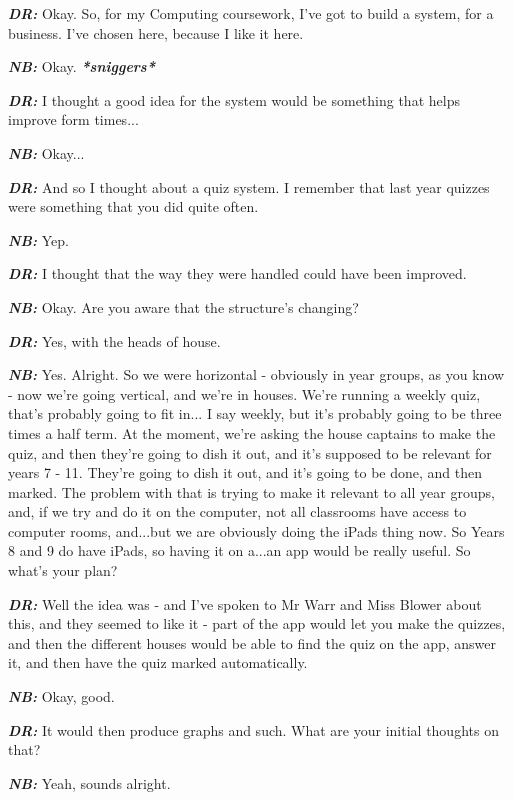 \textit{\textbf{DR:}} Okay. So, for my Computing coursework, I've got to build a system, for a business. I've chosen here, because I like it here.

\textit{\textbf{NB:}} Okay. \textit{\textbf{*sniggers*}}

\textit{\textbf{DR:}} I thought a good idea for the system would be something that helps improve form times...

\textit{\textbf{NB:}} Okay...

\textit{\textbf{DR:}} And so I thought about a quiz system. I remember that last year quizzes were something that you did quite often.

\textit{\textbf{NB:}} Yep.

\textit{\textbf{DR:}} I thought that the way they were handled could have been improved.

\textit{\textbf{NB:}} Okay. Are you aware that the structure's changing?

\textit{\textbf{DR:}} Yes, with the heads of house.

\textit{\textbf{NB:}} Yes. Alright. So we were horizontal - obviously in year groups, as you know - now we're going vertical, and we're in houses. We're running a weekly quiz, that's probably going to fit in... I say weekly, but it's probably going to be three times a half term. At the moment, we're asking the house captains to make the quiz, and then they're going to dish it out, and it's supposed to be relevant for years 7 - 11. They're going to dish it out, and it's going to be done, and then marked. The problem with that is trying to make it relevant to all year groups, and, if we try and do it on the computer, not all classrooms have access to computer rooms, and...but we are obviously doing the iPads thing now. So Years 8 and 9 do have iPads, so having it on a...an app would be really useful. So what's your plan?

\textit{\textbf{DR:}} Well the idea was - and I've spoken to Mr Warr and Miss Blower about this, and they seemed to like it - part of the app would let you make the quizzes, and then the different houses would be able to find the quiz on the app, answer it, and then have the quiz marked automatically.

\textit{\textbf{NB:}} Okay, good.

\textit{\textbf{DR:}} It would then produce graphs and such. What are your initial thoughts on that?

\textit{\textbf{NB:}} Yeah, sounds alright.


